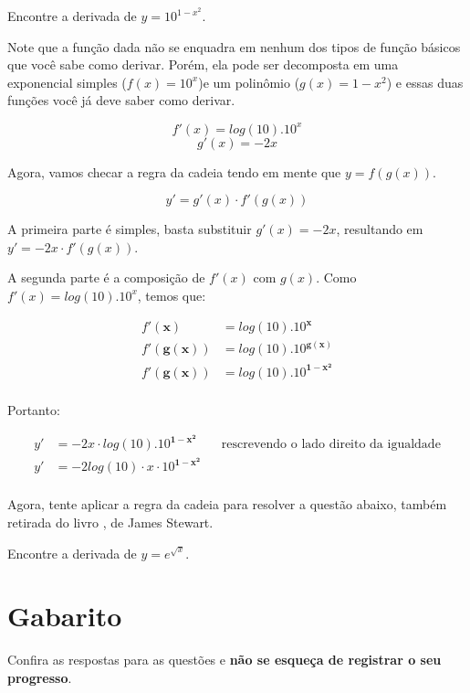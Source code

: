 \documentclass[main_estudante.tex]{subfiles}
\begin{document}
\begin{resolvida}
Encontre a derivada de $y=10^{1-x^2}$.
\end{resolvida}

Note que a função dada não se enquadra em nenhum dos tipos de função básicos que você sabe como derivar. Porém, ela pode ser decomposta em uma exponencial simples ($f(x)=10^x$)e um polinômio ($g(x)=1-x^2$) e essas duas funções você já deve saber como derivar.

$$f'(x)=log(10) . 10^x $$
$$g'(x)=-2x $$

Agora, vamos checar a regra da cadeia tendo em mente que $y=f(g(x))$.

$$y' = g'(x) \cdot f'(g(x))$$

A primeira parte é simples, basta substituir $g'(x)=-2x$, resultando em $y' = -2x \cdot f'(g(x))$.

A segunda parte é a composição de $f'(x)$ com $g(x)$. Como $f'(x)=log(10) . 10^x$, temos que:

\begin{align*}
 f'(\mathbf{x}) &= log(10) . 10^\mathbf{x} \\
 f'(\mathbf{g(x)}) &= log(10) . 10^\mathbf{g(x)} \\
 f'(\mathbf{g(x)}) &= log(10) . 10^\mathbf{1-x^2} \\
\end{align*}

Portanto:

\begin{align*}
y' &= -2x \cdot log(10) . 10^\mathbf{1-x^2} && \text{rescrevendo o lado direito da igualdade} \\
y' &= -2log(10) \cdot x \cdot 10^\mathbf{1-x^2} \\
\end{align*}

Agora, tente aplicar a regra da cadeia para resolver a questão abaixo, também retirada do livro , de James Stewart.

\begin{resolva}
Encontre a derivada de $y=e^{\sqrt{x}}$.
\end{resolva}

\newpage

\section{Gabarito}

Confira as respostas para as questões e \textbf{não se esqueça de registrar o seu progresso}.
\end{document}
